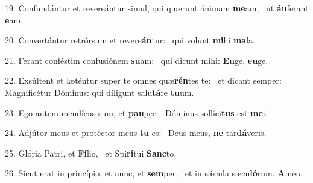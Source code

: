 19. Confundántur et revereántur simul, qui quærunt ánimam \textbf{me}am, \ast\  ut \textbf{áu}ferant \textbf{e}am.\

20. Convertántur retrórsum et revere\textbf{án}tur: \ast\  qui volunt \textbf{mi}hi \textbf{ma}la.\

21. Ferant conféstim confusiónem \textbf{su}am: \ast\  qui dicunt mihi: \textbf{Eu}ge, \textbf{eu}ge.\

22. Exsúltent et læténtur super te omnes quæ\textbf{rén}tes te: \ast\  et dicant semper: Magnificétur Dóminus: qui díligunt salu\textbf{tá}re \textbf{tu}um.\

23. Ego autem mendícus sum, et \textbf{pau}per: \ast\  Dóminus sollíci\textbf{tus} est \textbf{me}i.\

24. Adjútor meus et protéctor meus \textbf{tu} es: \ast\  Deus meus, \textbf{ne} tar\textbf{dá}veris.\

25. Glória Patri, et \textbf{Fí}lio, \ast\  et Spi\textbf{rí}tui \textbf{Sanc}to.\

26. Sicut erat in princípio, et nunc, et \textbf{sem}per, \ast\  et in sǽcula sæcu\textbf{ló}rum. \textbf{A}men.\

